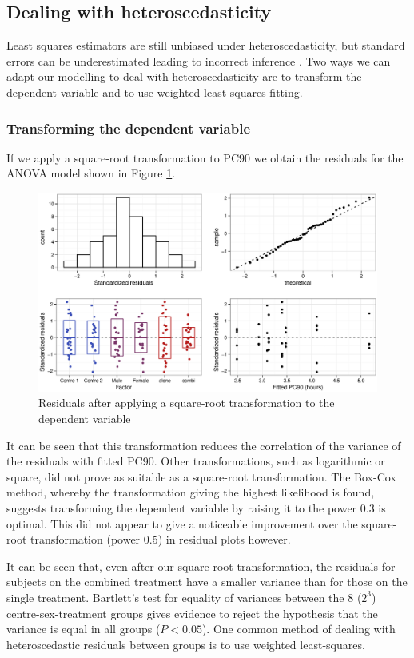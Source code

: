 \subsection{Dealing with heteroscedasticity}
Least squares estimators are still unbiased under heteroscedasticity, but standard errors can be underestimated leading to incorrect inference \cite{long}. Two ways we can adapt our modelling to deal with heteroscedasticity are to transform the dependent variable and to use weighted least-squares fitting.

\subsubsection*{Transforming the dependent variable}
If we apply a square-root transformation to PC90 we obtain the residuals for the ANOVA model shown in Figure \ref{aovsqrtres}.
\begin{figure}[h]
\includegraphics[width=150mm]{aovsqrtres.eps} 
\caption{Residuals after applying a square-root transformation to the dependent variable}
\label{aovsqrtres}
\end{figure}
It can be seen that this transformation reduces the correlation of the variance of the residuals with fitted PC90. Other transformations, such as logarithmic or square, did not prove as suitable as a square-root transformation. The Box-Cox method, whereby the transformation giving the highest likelihood is found, suggests transforming the dependent variable by raising it to the power 0.3 is optimal. This did not appear to give a noticeable improvement over the square-root transformation (power 0.5) in residual plots however.

It can be seen that, even after our square-root transformation, the residuals for subjects on the combined treatment have a smaller variance than for those on the single treatment. Bartlett's test for equality of variances \cite{montgomery} between the 8 ($2^{3}$) centre-sex-treatment groups gives evidence to reject the hypothesis that the variance is equal in all groups ($P<0.05$).  One common method of dealing with heteroscedastic residuals between groups is to use weighted least-squares.

